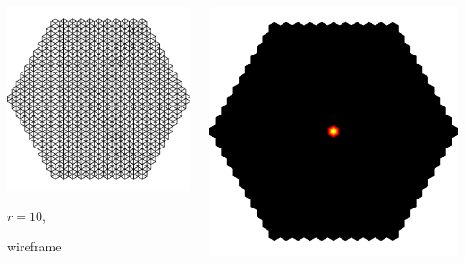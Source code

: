 \documentclass[aspectratio=169,t]{beamer}
\begin{document}
{\begin{columns}
\begin{column}{0.22\textwidth}
			\includegraphics[width=.85\textwidth]{data/synthetic_meshes/hexagonal_tessellation_Dirac_delta_10_v1057_f1986_wireframe.png}
			{\footnotesize 
				\par \vspace{-1mm} $r=10$, 
				\par \vspace{-1mm} wireframe
			}
		\end{column}
		\begin{column}{0.22\textwidth}
			\centering
			\includegraphics[width=.85\textwidth]{data/synthetic_meshes/hexagonal_tessellation_Dirac_delta_10_v1057_f1986_funcvals_0iter_crop.png}

\end{column}
\end{columns}}
\end{document}
